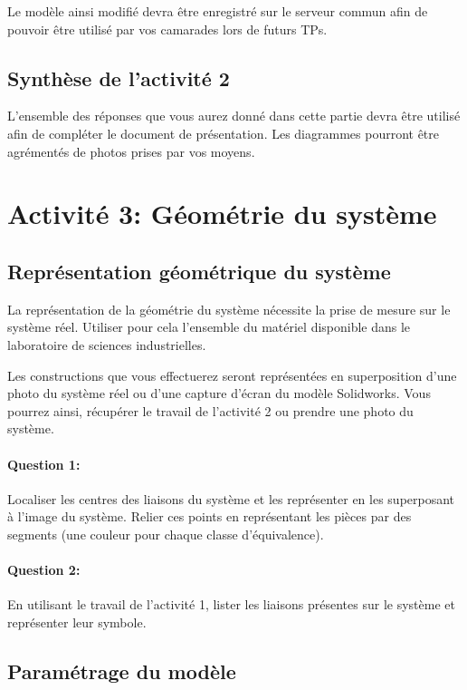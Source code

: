 Le modèle ainsi modifié devra être enregistré sur le serveur commun afin de pouvoir être utilisé par vos camarades lors de futurs TPs.

\subsection{Synthèse de l'activité 2}

L'ensemble des réponses que vous aurez donné dans cette partie devra être utilisé afin de compléter le document de présentation. Les diagrammes pourront être agrémentés de photos prises par vos moyens.

\section{Activité 3: Géométrie du système}

\subsection{Représentation géométrique du système}

La représentation de la géométrie du système nécessite la prise de mesure sur le système réel. Utiliser pour cela l'ensemble du matériel disponible dans le laboratoire de sciences industrielles.

Les constructions que vous effectuerez seront représentées en superposition d'une photo du système réel ou d'une capture d'écran du modèle Solidworks. Vous pourrez ainsi, récupérer le travail de l'activité 2 ou prendre une photo du système.

\paragraph{Question 1:} Localiser les centres des liaisons du système et les représenter en les superposant à l'image du système. Relier ces points en représentant les pièces par des segments (une couleur pour chaque classe d'équivalence).

\paragraph{Question 2:} En utilisant le travail de l'activité 1, lister les liaisons présentes sur le système et représenter leur symbole.

\reponse[4]

\subsection{Paramétrage du modèle}

